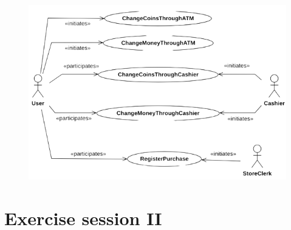 \documentclass[12pt, a4paper]{report}
\begin{document}
\begin{enumerate}
                \begin{figure}[H]
                    \centering
                    \includegraphics[width=0.9\linewidth]{images/usecase2.png}
                \end{figure}
        \end{enumerate}
    
    \newpage

    \chapter{Exercise session II}
\end{document}
